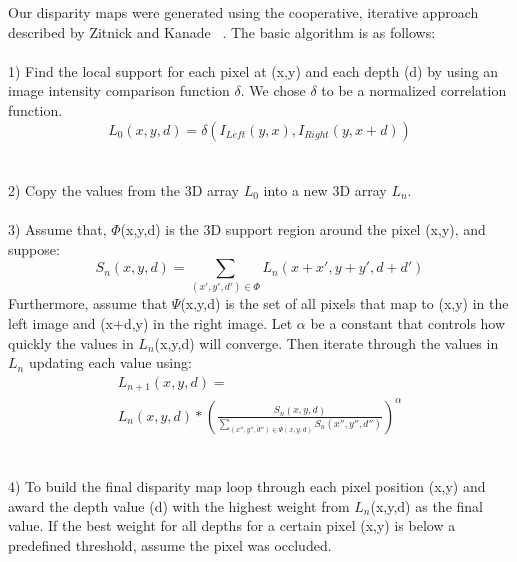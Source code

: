 \documentclass[a4paper,twoside]{article}
\begin{document}
Our disparity maps were generated using the cooperative, iterative approach described by Zitnick and Kanade ~\cite{stereo:zitKan}.  
The basic algorithm is as follows:
\\ \\
1) Find the local support for each pixel at (x,y) and each depth (d) by using an image intensity comparison function \(\delta\).  
We chose \(\delta\) to be a normalized correlation function.
\begin{equation}
L_0(x,y,d) = \delta(I_{Left}(y,x),I_{Right}(y,x+d))
\end{equation}
\\ \\
2) Copy the values from the 3D array \(L_0\) into a new 3D array \(L_n\).
\\ \\
3) Assume that, \(\Phi\)(x,y,d) is the 3D support region around the pixel (x,y), and suppose:
\begin{equation}
S_n(x,y,d) = \sum_{(x',y',d') \in \Phi} L_n (x+x', y+y', d+d') 
\end{equation}
Furthermore, assume that \(\Psi\)(x,y,d) is the set of all pixels that map to (x,y) in the left image and (x+d,y) in the right image. 
Let \(\alpha\) be a constant that controls how quickly the values in \(L_n\)(x,y,d) will converge.  
Then iterate through the values in \(L_n\) updating each value using: 
\begin{equation}
\begin{array}{ll}
L_{n+1}(x,y,d) = \\ 
L_n(x,y,d)*\left(  \frac{S_n(x,y,d)}{\sum\limits_{(x'',y'',d'') \in \Psi(x,y,d)} S_n(x'',y'',d'')} \right)^\alpha 
\end{array}
\end{equation}
\\ \\
4) To build the final disparity map loop through each pixel position (x,y) and award the depth value (d) with the highest weight from \(L_n\)(x,y,d) as the final value.
If the best weight for all depths for a certain pixel (x,y) is below a predefined threshold, assume the pixel was occluded.


\end{document}
